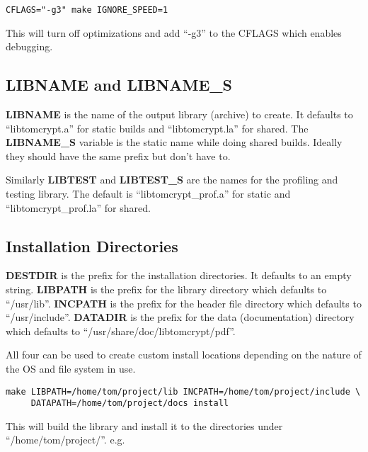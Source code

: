 \documentclass[a4paper]{book}
\begin{document}
\begin{verbatim}
CFLAGS="-g3" make IGNORE_SPEED=1
\end{verbatim}

This will turn off optimizations and add ``-g3'' to the CFLAGS which enables debugging.  

\subsection{LIBNAME and LIBNAME\_S}
 
\textbf{LIBNAME} is the name of the output library (archive) to create.  It defaults to ``libtomcrypt.a'' for static builds and ``libtomcrypt.la'' for
shared.  The \textbf{LIBNAME\_S} variable is the static name while doing shared builds.  Ideally they should have the same prefix but don't have to.

 
Similarly \textbf{LIBTEST} and \textbf{LIBTEST\_S} are the names for the profiling and testing library.  The default is ``libtomcrypt\_prof.a'' for 
static and ``libtomcrypt\_prof.la'' for shared.

\subsection{Installation Directories}
   
\textbf{DESTDIR} is the prefix for the installation directories.  It defaults to an empty string.  \textbf{LIBPATH} is the prefix for the library
directory which defaults to ``/usr/lib''.  \textbf{INCPATH} is the prefix for the header file directory which defaults to ``/usr/include''.  
\textbf{DATADIR} is the prefix for the data (documentation) directory which defaults to ``/usr/share/doc/libtomcrypt/pdf''.

All four can be used to create custom install locations depending on the nature of the OS and file system in use.

\begin{verbatim}
make LIBPATH=/home/tom/project/lib INCPATH=/home/tom/project/include \
     DATAPATH=/home/tom/project/docs install
\end{verbatim}

This will build the library and install it to the directories under ``/home/tom/project/''.  e.g.
\end{document}
